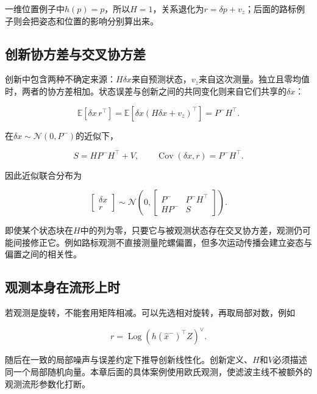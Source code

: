 一维位置例子中$h(p)=p$，所以$H=1$，关系退化为$r=\delta p+v_z$；后面的路标例子则会把姿态和位置的影响分别算出来。

\subsection{创新协方差与交叉协方差}

创新中包含两种不确定来源：$H\delta x$来自预测状态，$v_z$来自这次测量。独立且零均值时，两者的协方差相加。状态误差与创新之间的共同变化则来自它们共享的$\delta x$：

\begin{equation*}
\mathbb E[\delta x\,r^\top]
 =\mathbb E[\delta x(H\delta x+v_z)^\top]
 =P^-H^\top.
\end{equation*}

在$\delta x\sim\mathcal N(0,P^-)$的近似下，

\begin{equation*}
S=HP^-H^\top+V,
 \qquad \operatorname{Cov}(\delta x,r)=P^-H^\top.
\end{equation*}

因此近似联合分布为

\begin{equation*}
\begin{bmatrix}\delta x\\r\end{bmatrix}
 \sim\mathcal N\left(0,
 \begin{bmatrix}P^-&P^-H^\top\\HP^-&S\end{bmatrix}\right).
\end{equation*}

即使某个状态块在$H$中的列为零，只要它与被观测状态存在交叉协方差，观测仍可能间接修正它。例如路标观测不直接测量陀螺偏置，但多次运动传播会建立姿态与偏置之间的相关性。

\subsection{观测本身在流形上时}

若观测是旋转，不能套用矩阵相减。可以先选相对旋转，再取局部对数，例如

\begin{equation*}
r=\mathop{\mathrm{Log}}(h(\hat x^-)^\top Z)^\vee.
\end{equation*}

随后在一致的局部噪声与误差约定下推导创新线性化。创新定义、$H$和$V$必须描述同一个局部随机向量。本章后面的具体案例使用欧氏观测，使滤波主线不被额外的观测流形参数化打断。

